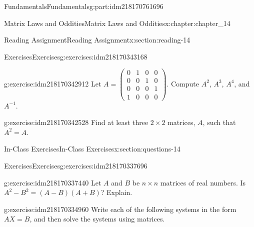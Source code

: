 \documentclass[oneside,10pt,]{book}
\numberwithin{equation}{section}
\begin{document}
\begin{partptx}{Fundamentals}{}{Fundamentals}{}{}{g:part:idm218170761696}
\begin{chapterptx}{Matrix Laws and Oddities}{}{Matrix Laws and Oddities}{}{}{x:chapter:chapter_14}
\begin{sectionptx}{Reading Assignment}{}{Reading Assignment}{}{}{x:section:reading-14}
\typeout{************************************************}
%
\begin{exercises-subsection-numberless}{Exercises}{}{Exercises}{}{}{g:exercises:idm218170343168}
\par\medskip\noindent%
%
\begin{exercisegroup}
\begin{divisionexerciseeg}{1}{}{}{g:exercise:idm218170342912}%
Let \(A=\left(\begin{array}{cccc} 0 &1&0&0\\
0 &0&1&0\\
0&0&0&1\\
1 &0&0&0 \end{array}\right)\). Compute \(A^2\), \(A^3\), \(A^4\), and \(A^{-1}\).%
\end{divisionexerciseeg}%
\begin{divisionexerciseeg}{2}{}{}{g:exercise:idm218170342528}%
Find at least three \(2\times2\) matrices, \(A\), such that \(A^2=A\).%
\end{divisionexerciseeg}%
\end{exercisegroup}
\par\medskip\noindent
\end{exercises-subsection-numberless}
\end{sectionptx}
%
%
\typeout{************************************************}
\typeout{************************************************}
%
\begin{sectionptx}{In-Class Exercises}{}{In-Class Exercises}{}{}{x:section:questions-14}
%
%
%
\typeout{************************************************}
\typeout{************************************************}
%
\begin{exercises-subsection-numberless}{Exercises}{}{Exercises}{}{}{g:exercises:idm218170337696}
\par\medskip\noindent%
%
\begin{exercisegroup}
\begin{divisionexerciseeg}{1}{}{}{g:exercise:idm218170337440}%
Let \(A\) and \(B\) be \(n\times n\) matrices of real numbers. Is \(A^2-B^2= (A-B)(A+B)\)?  Explain.%
\end{divisionexerciseeg}%
\begin{divisionexerciseeg}{2}{}{}{g:exercise:idm218170334960}%
Write each of the following systems in the form \(A X = B\), and then solve the systems using matrices.%
\par

\end{divisionexerciseeg}
\end{exercisegroup}
\end{exercises-subsection-numberless}
\end{sectionptx}
\end{chapterptx}
\end{partptx}
\end{document}
